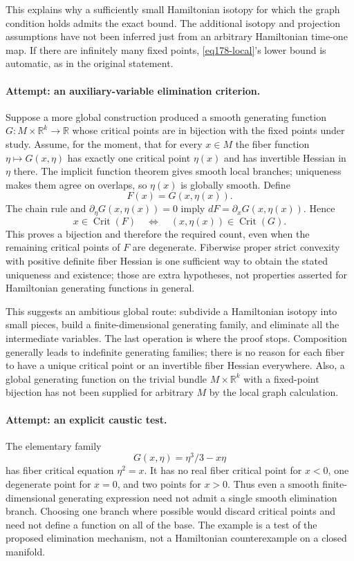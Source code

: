 \documentclass[11pt,a4paper]{article}
\newcommand{\R}{\mathbb{R}}
\numberwithin{equation}{section}
\begin{document}
This explains why a sufficiently small Hamiltonian isotopy for which the
graph condition holds admits the exact bound. The additional isotopy and
projection assumptions have not been inferred just from an arbitrary
Hamiltonian time-one map. If there are infinitely many fixed points,
\eqref{eq178-local}'s lower bound is automatic, as in the original statement.

\paragraph{Attempt: an auxiliary-variable elimination criterion.}
Suppose a more global construction produced a smooth generating function
$G:M\times\R^k\to\R$ whose critical points are in bijection with the
fixed points under study. Assume, for the moment, that for every $x\in M$
the fiber function $\eta\mapsto G(x,\eta)$ has exactly one critical point
$\eta(x)$ and has invertible Hessian in $\eta$ there. The implicit function
theorem gives smooth local branches; uniqueness makes them agree on overlaps,
so $\eta(x)$ is globally smooth. Define
\[
                           F(x)=G(x,\eta(x)).
\]
The chain rule and $\partial_\eta G(x,\eta(x))=0$ imply
$dF=\partial_xG(x,\eta(x))$. Hence
\begin{equation}\label{eq178-eliminate}
 x\in\operatorname{Crit}(F)
 \quad\Longleftrightarrow\quad
 (x,\eta(x))\in\operatorname{Crit}(G).
\end{equation}
This proves a bijection and therefore the required count, even when the
remaining critical points of $F$ are degenerate. Fiberwise proper strict
convexity with positive definite fiber Hessian is one sufficient way to
obtain the stated uniqueness and existence; those are extra hypotheses,
not properties asserted for Hamiltonian generating functions in general.

This suggests an ambitious global route: subdivide a Hamiltonian isotopy
into small pieces, build a finite-dimensional generating family, and
eliminate all the intermediate variables. The last operation is where the
proof stops. Composition generally leads to indefinite generating families;
there is no reason for each fiber to have a unique critical point or an
invertible fiber Hessian everywhere. Also, a global generating function
on the trivial bundle $M\times\R^k$ with a fixed-point bijection has not
been supplied for arbitrary $M$ by the local graph calculation.

\paragraph{Attempt: an explicit caustic test.}
The elementary family
\[
                            G(x,\eta)=\eta^3/3-x\eta
\]
has fiber critical equation $\eta^2=x$. It has no real fiber critical point
for $x<0$, one degenerate point for $x=0$, and two points for $x>0$.
Thus even a smooth finite-dimensional generating expression need not admit
a single smooth elimination branch. Choosing one branch where possible
would discard critical points and need not define a function on all of
the base. The example is a test of the proposed elimination mechanism, not
a Hamiltonian counterexample on a closed manifold.
\end{document}
